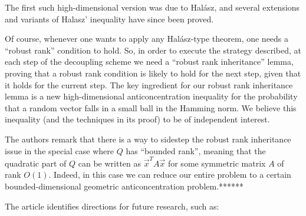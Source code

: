 The first such high-dimensional version was due to Halász, and several extensions and variants of Halasz’ inequality have since been proved.
 
Of course, whenever one wants to apply any Halász-type theorem, one needs a “robust rank” condition to hold. So, in order to execute the strategy described, at each step of the decoupling scheme we need a “robust rank inheritance” lemma, proving that a robust rank condition is likely to hold for the next step, given that it holds for the current step. The key ingredient for our robust rank inheritance lemma is a new high-dimensional anticoncentration inequality for the probability that a random vector falls in a small ball in the Hamming norm. We believe this inequality (and the techniques in its proof) to be of independent interest.
 
The authors remark that there is a way to sidestep the robust rank inheritance issue in the special case where $Q$ has “bounded rank”, meaning that the quadratic part of $Q$ can be written as $\vec{x}^T A \vec{x}$ for some symmetric matrix $A$ of rank $O(1)$. Indeed, in this case we can reduce our entire problem to a certain bounded-dimensional geometric anticoncentration problem.******
 
\vspace{\baselineskip}
The article identifies directions for future research, such as:
 
